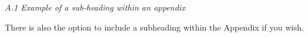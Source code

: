 \documentclass[10pt,twoside]{article}
\begin{document}

\vspace{1\baselineskip}
\textit{A.1 Example of a sub-heading within an appendix}
\vspace{1\baselineskip}

There is also the option to include a subheading within the Appendix if you wish.


\printbibliography
\end{document}
